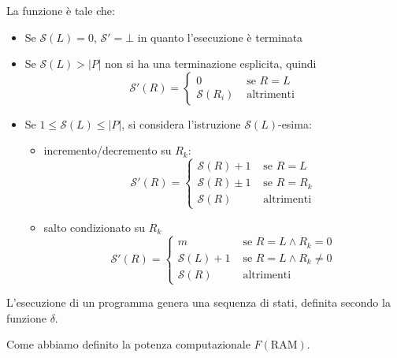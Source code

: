 \documentclass[12pt, answers]{exam}
\theoremstyle{plain}
\newcommand{\ram}{\text{RAM}}
\newcommand{\st}{\mathcal{S}}
\begin{document}
\begin{questions}
\begin{solution}
            La funzione è tale che: 
            \begin{itemize}
                \item Se $\st(L) = 0$, $\st' = \bot$ in quanto l'esecuzione è terminata
                
                \item Se $\st(L) > |P|$ non si ha una terminazione esplicita, quindi
                $$ \st' (R) = \begin{cases}
                    0 & \text{ se } R = L \\
                    \st(R_i) & \text{ altrimenti}
                \end{cases} $$
                
                \item Se $1 \leq \st (L) \leq |P|$, si considera l'istruzione $\st(L)$-esima:
                \begin{itemize}
                    \item incremento/decremento su $R_k$:
                    $$
                    \st' (R) = \begin{cases}
                        \st (R) + 1 & \text{ se } R = L \\ 
                        \st (R) \pm 1 & \text{ se } R = R_k \\
                        \st (R) & \text{ altrimenti}
                    \end{cases}
                    $$
                    
                    \item salto condizionato su $R_k$
                    $$
                    \st' (R) = \begin{cases}
                        m & \text{ se } R = L \wedge R_k = 0 \\
                        \st (L) + 1 & \text{ se } R = L \wedge R_k \neq 0 \\
                        \st (R) & \text{ altrimenti}
                    \end{cases}
                    $$
                \end{itemize}
            \end{itemize}
            
            L'esecuzione di un programma genera una sequenza di stati, definita secondo la funzione $\delta$.
        \end{solution}
        
        \question Come abbiamo definito la potenza computazionale $F(\ram)$.
\end{questions}
    
\end{document}
